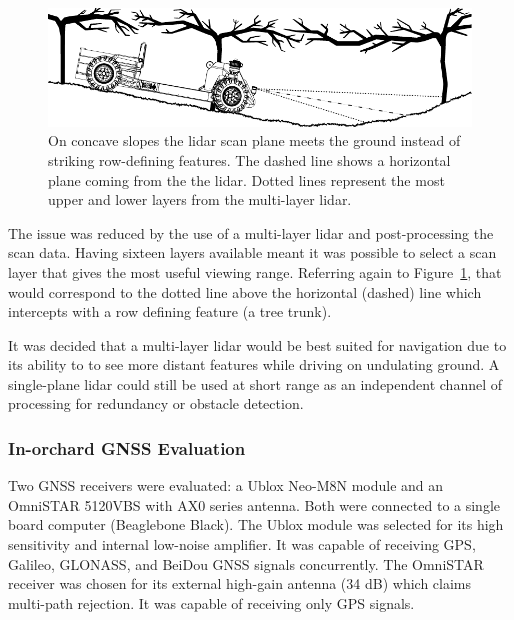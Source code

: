 \documentclass[preprint,authoryear,12pt]{elsarticle}
\begin{document}
        \begin{figure}[htb]
            \centering
            \includegraphics[width=\linewidth]{imgs/concave_slope/concave_slope_v4.pdf}
            \caption{
                On concave slopes the lidar scan plane meets the ground instead of striking row-defining features.
                The dashed line shows a horizontal plane coming from the the lidar.
                Dotted lines represent the most upper and lower layers from the multi-layer lidar.
            }
            \label{fig:concaveSlope}
        \end{figure}

        The issue was reduced by the use of a multi-layer lidar and post-processing the scan data.
        Having sixteen layers available meant it was possible to select a scan layer that gives the most useful viewing range.
        Referring again to Figure~\ref{fig:concaveSlope}, that would correspond to the dotted line above the horizontal (dashed) line which intercepts with a row defining feature (a tree trunk).

        It was decided that a multi-layer lidar would be best suited for navigation due to its ability to to see more distant features while driving on undulating ground.
        A single-plane lidar could still be used at short range as an independent channel of processing for redundancy or obstacle detection.

    \subsubsection{In-orchard GNSS Evaluation}
        Two GNSS receivers were evaluated: a Ublox Neo-M8N module and an OmniSTAR 5120VBS with AX0 series antenna.
        Both were connected to a single board computer (Beaglebone Black).
        The Ublox module was selected for its high sensitivity and internal low-noise amplifier.
        It was capable of receiving GPS, Galileo, GLONASS, and BeiDou GNSS signals concurrently.
        The OmniSTAR receiver was chosen for its external high-gain antenna (34 dB) which claims multi-path rejection.
        It was capable of receiving only GPS signals.
\end{document}
